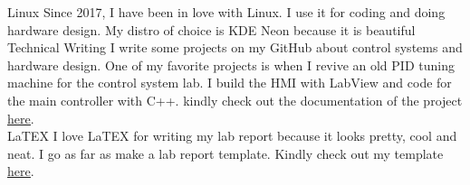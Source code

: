 


\begin{cvskills}

  \cvskill
    {Linux} %
    {Since 2017, I have been in love with Linux. I use it for coding and doing hardware design. My distro of choice is KDE Neon because it is beautiful}\\ %
  \cvskill
    {Technical Writing} %
    {I write some projects on my GitHub about control systems and hardware design. One of my favorite projects is when I  revive an old PID tuning machine for the control system lab. I build the HMI with LabView and code for the main controller with C++. kindly check out the documentation of the project \href{https://github.com/justraven/Feedback-Educational-Servo-ES151-Remake}{\underline{here}}.}\\ %
  \cvskill
    {LaTEX} %
    {I love LaTEX for writing my lab report because it looks pretty, cool and neat. I go as far as make a lab report template. Kindly check out my template \href{https://github.com/justraven/template-laporan-praktikum-LaTEX}{\underline{here}}.} %

\end{cvskills}